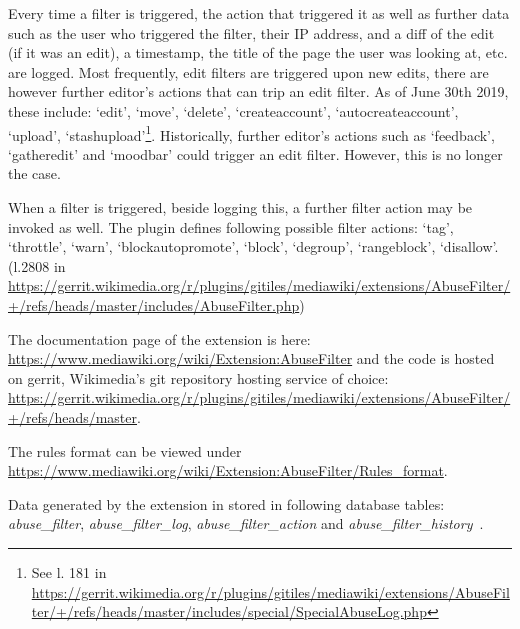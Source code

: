 Every time a filter is triggered, the action that triggered it as well as further data such as the user who triggered the filter, their IP address, and a diff of the edit (if it was an edit), a timestamp, the title of the page the user was looking at, etc. are logged.
Most frequently, edit filters are triggered upon new edits, there are however further editor's actions that can trip an edit filter.
As of June 30th 2019, these include: `edit', `move', `delete', `createaccount', `autocreateaccount', `upload', `stashupload'\footnote{See l. 181 in \url{https://gerrit.wikimedia.org/r/plugins/gitiles/mediawiki/extensions/AbuseFilter/+/refs/heads/master/includes/special/SpecialAbuseLog.php}}.
Historically, further editor's actions such as `feedback', `gatheredit' and `moodbar' could trigger an edit filter.
However, this is no longer the case. %

When a filter is triggered, beside logging this, a further filter action may be invoked as well.
The plugin defines following possible filter actions:
`tag', `throttle', `warn', `blockautopromote', `block', `degroup', `rangeblock', `disallow'. (l.2808 in \url{https://gerrit.wikimedia.org/r/plugins/gitiles/mediawiki/extensions/AbuseFilter/+/refs/heads/master/includes/AbuseFilter.php})

The documentation page of the extension is here: \url{https://www.mediawiki.org/wiki/Extension:AbuseFilter}
and the code is hosted on gerrit, Wikimedia's git repository hosting service of choice: \url{https://gerrit.wikimedia.org/r/plugins/gitiles/mediawiki/extensions/AbuseFilter/+/refs/heads/master}.

The rules format can be viewed under \url{https://www.mediawiki.org/wiki/Extension:AbuseFilter/Rules_format}.

Data generated by the extension in stored in following database tables: \emph{abuse\_filter}, \emph{abuse\_filter\_log}, \emph{abuse\_filter\_action} and \emph{abuse\_filter\_history}~\cite{gerrit-abusefilter}.

